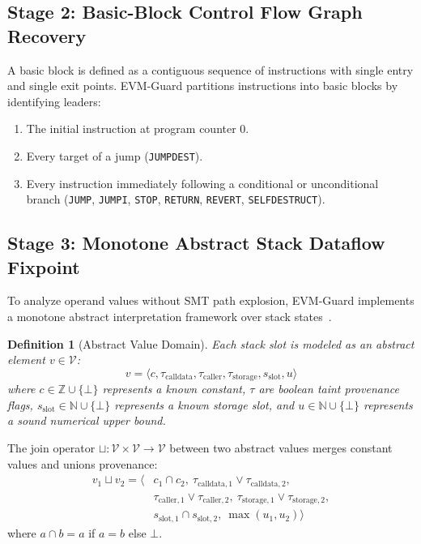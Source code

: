 \documentclass[conference]{IEEEtran}
\newtheorem{defn}{Definition}
\newenvironment{definition}[1][]{\begin{defn}[#1]\upshape}{\end{defn}}
\begin{document}
\subsection{Stage 2: Basic-Block Control Flow Graph Recovery}
A basic block is defined as a contiguous sequence of instructions with single entry and single exit points. EVM-Guard partitions instructions into basic blocks by identifying leaders:
\begin{enumerate}
    \item The initial instruction at program counter 0.
    \item Every target of a jump (\texttt{JUMPDEST}).
    \item Every instruction immediately following a conditional or unconditional branch (\texttt{JUMP}, \texttt{JUMPI}, \texttt{STOP}, \texttt{RETURN}, \texttt{REVERT}, \texttt{SELFDESTRUCT}).
\end{enumerate}

\subsection{Stage 3: Monotone Abstract Stack Dataflow Fixpoint}
To analyze operand values without SMT path explosion, EVM-Guard implements a monotone abstract interpretation framework over stack states~\cite{cousot1977abstract}.

\begin{definition}[Abstract Value Domain]
Each stack slot is modeled as an abstract element $v \in \mathcal{V}$:
\begin{equation}
v = \langle c, \tau_{\mathrm{calldata}}, \tau_{\mathrm{caller}}, \tau_{\mathrm{storage}}, s_{\mathrm{slot}}, u \rangle
\end{equation}
where $c \in \mathbb{Z} \cup \{\bot\}$ represents a known constant, $\tau$ are boolean taint provenance flags, $s_{\mathrm{slot}} \in \mathbb{N} \cup \{\bot\}$ represents a known storage slot, and $u \in \mathbb{N} \cup \{\bot\}$ represents a sound numerical upper bound.
\end{definition}

The join operator $\sqcup: \mathcal{V} \times \mathcal{V} \to \mathcal{V}$ between two abstract values merges constant values and unions provenance:
\begin{align}
v_1 \sqcup v_2 = \langle &c_1 \cap c_2, \ \tau_{\mathrm{calldata}, 1} \lor \tau_{\mathrm{calldata}, 2}, \nonumber \\
&\tau_{\mathrm{caller}, 1} \lor \tau_{\mathrm{caller}, 2}, \ \tau_{\mathrm{storage}, 1} \lor \tau_{\mathrm{storage}, 2}, \nonumber \\
&s_{\mathrm{slot}, 1} \cap s_{\mathrm{slot}, 2}, \ \max(u_1, u_2) \rangle
\end{align}
where $a \cap b = a$ if $a = b$ else $\bot$.
\end{document}

